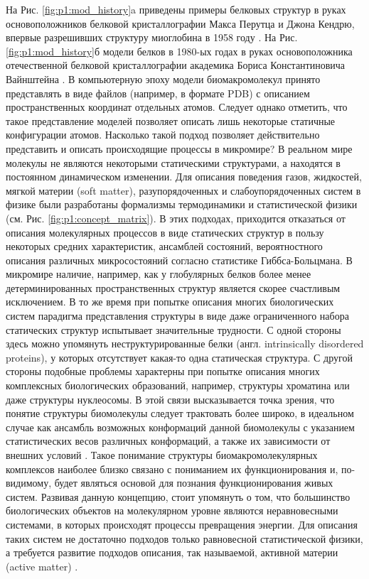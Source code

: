 На Рис. \ref{fig:p1:mod_history}a приведены примеры белковых структур в руках основоположников белковой кристаллографии Макса Перутца и Джона Кендрю, впервые разрешивших структуру миоглобина в 1958 году \cite{jc_three-dimensional_1958}. На Рис. \ref{fig:p1:mod_history}б модели белков в 1980-ых годах в руках основоположника отечественной белковой кристаллографии академика Бориса Константиновича Вайнштейна \cite{kovalchuk__2012}. В компьютерную эпоху модели биомакромолекул принято представлять в виде файлов (например, в формате PDB) с описанием пространственных координат отдельных атомов. Следует однако отметить, что такое представление моделей позволяет описать лишь некоторые статичные конфигурации атомов. Насколько такой подход позволяет действительно представить и описать происходящие процессы в микромире? В реальном мире молекулы не являются некоторыми статическими структурами, а находятся в постоянном динамическом изменении. Для описания поведения газов, жидкостей, мягкой материи (soft matter), разупорядоченных и слабоупорядоченных систем в физике были разработаны формализмы термодинамики и статистической физики (см. Рис. \ref{fig:p1:concept_matrix}). В этих подходах, приходится отказаться от описания молекулярных процессов в виде статических структур в пользу некоторых средних характеристик, ансамблей состояний, вероятностного описания различных микросостояний согласно статистике Гиббса-Больцмана. В микромире наличие, например, как у глобулярных белков более менее детерминированных пространственных структур является скорее счастливым исключением. В то же время при попытке описания многих биологических систем парадигма представления структуры в виде даже ограниченного набора статических структур испытывает значительные трудности. С одной стороны здесь можно упомянуть неструктурированные белки (англ. intrinsically disordered proteins), у которых отсутствует какая-то одна статическая структура. С другой стороны подобные проблемы характерны при попытке описания многих комплексных биологических образований, например, структуры хроматина или даже структуры нуклеосомы. В этой связи высказывается точка зрения, что понятие структуры биомолекулы следует трактовать более широко, в идеальном случае как ансамбль возможных конформаций данной биомолекулы с указанием статистических весов различных конформаций, а также их зависимости от внешних условий \cite{mannige_dynamic_2014}. Такое понимание структуры биомакромолекулярных комплексов наиболее близко связано с пониманием их функционирования и, по-видимому, будет являться основой для познания функционирования живых систем. Развивая данную концепцию, стоит упомянуть о том, что большинство биологических объектов на молекулярном уровне являются неравновесными системами, в которых происходят процессы превращения энергии. Для описания таких систем не достаточно подходов только равновесной статистической физики, а требуется развитие подходов описания, так называемой, активной материи (active matter) \cite{needleman_active_2017}. 

